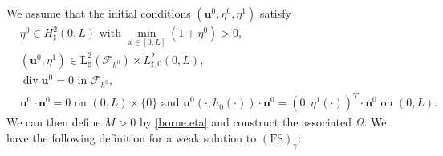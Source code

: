 \documentclass[11pt]{article}
\let\mathcal\mathscr
\newcommand{\FS}{\mathrm{FS}}
\theoremstyle{remark}
\theoremstyle{definition}
\newcommand{\ug}{\boldsymbol{u}}
\DeclareMathOperator{\DIV}{div}
\newcommand{\BS}[1]{\boldsymbol{#1}}
\let\CM\Omega
\begin{document}
We assume that the initial conditions $(\ug^{0},\eta^{0},\eta^{1})$ satisfy\vspace*{-3pt}
\begin{align}
&\eta^{0}\in H^{2}_{\sharp}(0,L) \text{ with }\min_{x\in [0,L]}(1+\eta^{0})>0,\label{CI1}\\
&(\ug^0,\eta^{1})\in \BS{L}_\sharp^{2}(\mathcal{F}_{h^{0}})\times L_{\sharp, 0}^{2}(0,L),\label{CI2}\\
& \DIV{\ug^{0}}=0 \text{ in }\mathcal{F}_{h^{0}},\label{CI3}\\
&\ug^{0}\cdot \BS{n}^0 = 0 \text{ on } (0, L)\times \{0\} \text{ and } \ug^{0}(\cdot, h_0(\cdot))\cdot \BS{n}^0= (0, \eta^{1}(\cdot) )^T\cdot \BS{n}^0\text{ on }(0, L).\label{CI4}
\end{align}
We can then define $M>0$ by \eqref{borne.eta} and construct the associated $\CM$.
We have the following definition for a weak solution to $(\FS)_{\gamma}$:
\end{document}
